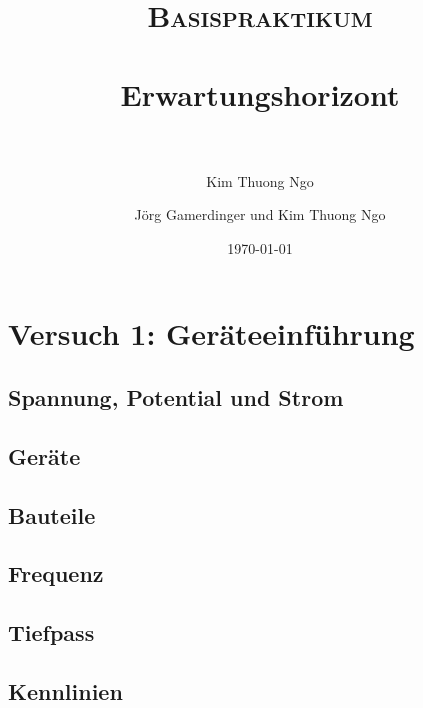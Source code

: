 \documentclass[paper=a4, fontsize=11pt]{scrartcl}
\author{Kim Thuong Ngo}
\title{
\normalfont \normalsize
\textsc{Basispraktikum} \\ [25pt]
\horrule{0.5pt} \\[0.4cm]
\huge Erwartungshorizont \\
\horrule{2pt} \\[0.5cm]
}
\author{Jörg Gamerdinger und Kim Thuong Ngo}
\date{\normalsize\today}
\numberwithin{equation}{section}
\numberwithin{figure}{section}
\numberwithin{table}{section}
\begin{document}
\maketitle

\newpage

\tableofcontents


\newpage

\section{Versuch 1: Geräteeinführung}


\subsection{Spannung, Potential und Strom}



\subsection{Geräte}



\subsection{Bauteile}



\subsection{Frequenz}



\subsection{Tiefpass}



\subsection{Kennlinien}
\end{document}

